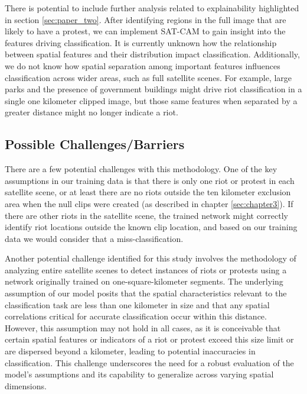 There is potential to include further analysis related to explainability highlighted in section \ref{sec:paper_two}.  After identifying regions in the full image that are likely to have a protest, we can implement SAT-CAM to gain insight into the features driving classification.  It is currently unknown how the relationship between spatial features and their distribution impact classification.  Additionally, we do not know how spatial separation among important features influences classification across wider areas, such as full satellite scenes.  For example, large parks and the presence of government buildings might drive riot classification in a single one kilometer clipped image, but those same features when separated by a greater distance might no longer indicate a riot.


\subsection{Possible Challenges/Barriers}
There are a few potential challenges with this methodology.  One of the key assumptions in our training data is that there is only one riot or protest in each satellite scene, or at least there are no riots outside the ten kilometer exclusion area when the null clips were created (as described in chapter \ref{sec:chapter3}).  If there are other riots in the satellite scene, the trained network might correctly identify riot locations outside the known clip location, and based on our training data we would consider that a miss-classification.  

Another potential challenge identified for this study involves the methodology of analyzing entire satellite scenes to detect instances of riots or protests using a network originally trained on one-square-kilometer segments. The underlying assumption of our model posits that the spatial characteristics relevant to the classification task are less than one kilometer in size and that any spatial correlations critical for accurate classification occur within this distance. However, this assumption may not hold in all cases, as it is conceivable that certain spatial features or indicators of a riot or protest exceed this size limit or are dispersed beyond a kilometer, leading to potential inaccuracies in classification. This challenge underscores the need for a robust evaluation of the model's assumptions and its capability to generalize across varying spatial dimensions.


